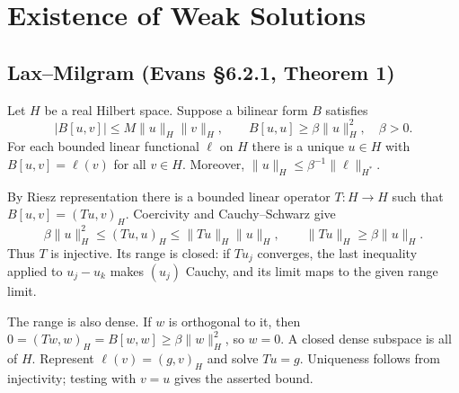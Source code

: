 \Needspace{65mm}
\section{Existence of Weak Solutions}
\label{sec:6-2}
\subsection{Lax--Milgram (Evans \S6.2.1, Theorem 1)}
\begin{theorem}\label{thm:6-lax-milgram}
Let $H$ be a real Hilbert space. Suppose a bilinear form $B$ satisfies
\[
 |B[u,v]|\leq M\|u\|_H\|v\|_H,\qquad
 B[u,u]\geq\beta\|u\|_H^2,\quad\beta>0.
\]
For each bounded linear functional $\ell$ on $H$ there is a unique $u\in H$
with $B[u,v]=\ell(v)$ for all $v\in H$. Moreover,
$\|u\|_H\leq\beta^{-1}\|\ell\|_{H^*}$.
\end{theorem}
\Needspace{45mm}
\begin{expandedproof}
By Riesz representation there is a bounded linear operator $T:H\to H$
such that $B[u,v]=(Tu,v)_H$. Coercivity and Cauchy--Schwarz give
\[
 \beta\|u\|_H^2\leq(Tu,u)_H\leq\|Tu\|_H\|u\|_H,
 \qquad \|Tu\|_H\geq\beta\|u\|_H.
\]
Thus $T$ is injective. Its range is closed: if $Tu_j$ converges, the
last inequality applied to $u_j-u_k$ makes $(u_j)$ Cauchy, and its limit
maps to the given range limit.

The range is also dense. If $w$ is orthogonal to it, then
$0=(Tw,w)_H=B[w,w]\geq\beta\|w\|_H^2$, so $w=0$.
A closed dense subspace is all of $H$. Represent $\ell(v)=(g,v)_H$
and solve $Tu=g$. Uniqueness follows from injectivity; testing with
$v=u$ gives the asserted bound.
\end{expandedproof}

\Needspace{35mm}
